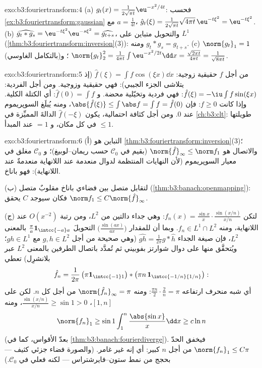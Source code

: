 \begin{solution}{exo:b3:fouriertransform:4}
(a) $g_t(x) = \frac1{2\sqrt{\pi t}}\eu^{-x^2/4t}$: فحسب \cref{ex:b3:fouriertransform:gaussian} مع $a = \frac1{4t}$، $\hat g_t(\xi) = \frac1{2\sqrt{\pi t}}\sqrt{4\pi
t}\,\eu^{-t\xi^2} = \eu^{-t\xi^2}$.
(b) $\widehat{g_t * g_s} = \eu^{-t\xi^2}\eu^{-s\xi^2} =
\widehat{g_{t+s}}$، والتحويل متباين على $L^1$ (\cref{thm:b3:fouriertransform:inversion}(3)): ومنه
$g_t * g_s =
g_{t+s}$.
(c) $\norm{g_t}_1 = 1$ (بالتكامل الغاوسي)؛ و $\norm{g_t}_2^2 = \frac1{4\pi t}\int\eu^{-x^2/2t}\dd x =
\frac{\sqrt{2\pi t}}{4\pi t} = \frac1{\sqrt{8\pi t}}$.
\end{solution}

\begin{solution}{exo:b3:fouriertransform:5}
من أجل $f$ حقيقية زوجية: $\hat f(\xi) = \int f\cos(\xi x)\dd x$ (إذ يتلاشى الجزء الجيبي):
فهي حقيقية وزوجية. ومن أجل الفردية: $\hat f(\xi) =
-\iu\int f\sin(\xi x)$: فهي فردية وتخيّلية
محضة. و $\hat f(0) =
\int f$: أي الكتلة الكلية. وإذا كانت $f \geq 0$: فإن
$\abs{\hat f(\xi)}
\leq \int\abs f = \int f = \hat f(0)$، ومنه يُبلَغ السوپريموم عند $0$. ومن أجل كثافة احتمالية،
يكون $\hat f(-\xi)$ الدالةَ المميِّزة في \cref{ch:b3:clt}: طويلتها
$\leq 1$ في كل مكان، و $= 1$ عند المبدأ.
\end{solution}

\begin{solution}{exo:b3:fouriertransform:6}
(أ) التباين هو \cref{thm:b3:fouriertransform:inversion}(3)؛ والاتصال هو $\norm{\hat f}_\infty \leq \norm f_1$ (بقيم في
$\mathcal C_0$ حسب ريمان--لوبيغ)؛ و $\mathcal C_0$ مغلق في
معيار السوپريموم (لأن النهايات المنتظمة لدوال منعدمة عند
اللانهاية منعدمةٌ عند اللانهاية): فهو باناخ.

(ب) لتقابل متصل بين فضاءي باناخ مقلوبٌ متصل (\cref{thm:b3:banach:openmapping}): فكان
سيوجد $C$ يحقق $\norm f_1 \leq C\norm{\hat f}_\infty$.

(ج) لتكن $f_n(x) = \frac{\sin x}x\cdot\frac{\sin(x/n)}{x/n}$: وهي جداء دالتين من $L^2$، ومن رتبة $O(x^{-2})$
عند اللانهاية، ومنه $f_n \in L^1\cap L^2$. وبما أن للمقدار $\bigl(\frac{\sin(ax)}{ax}\bigr)$ التحويلَ
$\frac\pi a\mathbf 1_{\intcc{-a}a}$ بالمعنى $L^2$، فإن صيغة الجداء $\widehat{gh} = \frac1{2\pi}\hat g * \hat h$ (وهي صحيحة من أجل
$g, h
\in L^2$ مع $gh \in L^1$؛ ويُتحقَّق منها على دوال شوارتز بفوبيني
ثم تُمدَّد باتصال الطرفين بالمعنى $L^2$ عبر بلانشرِل) تعطي
\[
\hat f_n = \frac1{2\pi}\,\bigl(\pi\mathbf
1_{\intcc{-1}1}\bigr) * \bigl(\pi n\,\mathbf
1_{\intcc{-1/n}{1/n}}\bigr):
\]
أي شبه منحرف ارتفاعه $\frac{\pi n}2\cdot\frac2n = \pi$: ومنه $\norm{\hat f_n}_\infty = \pi$ من أجل كل $n$. لكن على
$[1,
n]$، $\frac{\sin(x/n)}{x/n} \geq \sin 1 > 0$، ومنه
\[
\norm{f_n}_1 \geq \sin 1\int_1^n\frac{\abs{\sin x}}x\dd x
\geq c\ln n
\]
(بعدّ الأقواس، كما في \cref{thm:b3:banach:fourierdiverge}). فيخفق الحدّ $\norm{f_n}_1 \leq C\pi$ من أجل $n$
كبير: أي إنه غير غامر. (والصورة فضاء جزئي كثيف --- بحجج من نمط
ستون--فايرشتراس --- لكنه فعلي في $\mathcal C_0$.)
\end{solution}

